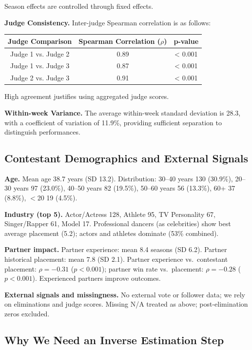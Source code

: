 \documentclass{mcmthesis}
\begin{document}
Season effects are controlled through fixed effects.

\textbf{Judge Consistency.}  
Inter-judge Spearman correlation is as follows:\\

\begin{table}[h]
\centering
\begin{tabular}{c c c}
\toprule
\textbf{Judge Comparison} & \textbf{Spearman Correlation} ($\rho$) & \textbf{p-value} \\
\midrule
Judge 1 vs. Judge 2 & 0.89 & < 0.001 \\
Judge 1 vs. Judge 3 & 0.87 & < 0.001 \\
Judge 2 vs. Judge 3 & 0.91 & < 0.001 \\
\bottomrule
\end{tabular}
\end{table}


High agreement justifies using aggregated judge scores.

\textbf{Within-week Variance.}  
The average within-week standard deviation is 28.3, with a coefficient of variation of 11.9\%, providing sufficient separation to distinguish performances.

\iffalse
\subsection{Contestant Demographics and External Signals}

\textbf{Age.}
Mean age 38.7 years (SD 13.2). Distribution: 30--40 years 130 (30.9\%), 20--30 years 97 (23.0\%), 40--50 years 82 (19.5\%), 50--60 years 56 (13.3\%), 60+ 37 (8.8\%), $<$20 19 (4.5\%).

\textbf{Industry (top 5).}
Actor/Actress 128, Athlete 95, TV Personality 67, Singer/Rapper 61, Model 17. Professional dancers (as celebrities) show best average placement (5.2); actors and athletes dominate (53\% combined).

\textbf{Partner impact.}
Partner experience: mean 8.4 seasons (SD 6.2). Partner historical placement: mean 7.8 (SD 2.1). Partner experience vs.\ contestant placement: $\rho = -0.31$ ($p < 0.001$); partner win rate vs.\ placement: $\rho = -0.28$ ($p < 0.001$). Experienced partners improve outcomes.

\textbf{External signals and missingness.}
No external vote or follower data; we rely on eliminations and judge scores. Missing N/A treated as above; post-elimination zeros excluded.

\subsection{Why We Need an Inverse Estimation Step}
\end{document}
